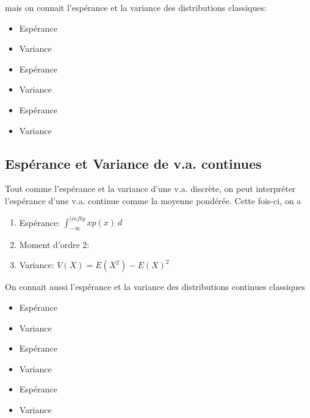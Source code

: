 \documentclass{article}
\begin{document}
mais on connait l'espérance et la variance des distributions classiques:
\begin{enumerate}
	\begin{itemize}[Binomiale]
	    \item Espérance
	    \item Variance
	\end{itemize}
	\begin{itemize}[Poisson]
	    \item Espérance
	    \item Variance
	\end{itemize}
	\begin{itemize}[Géométrique]
	    \item Espérance
	    \item Variance
	\end{itemize}
\end{enumerate}

\subsection{Espérance et Variance de v.a. continues}

Tout comme l'espérance et la variance d'une v.a. discrète, on peut
interpréter l'espérance d'une v.a. continue comme la moyenne pondérée.
Cette fois-ci, on a
\begin{enumerate}
    \item Espérance: $ \int_{{-\infty}}^{{]infty}} {x p(x)} \: d{} {}$
    \item Moment d'ordre 2:
    \item Variance: $V(X) = E(X^2) - E(X)^2 $
\end{enumerate}

On connait aussi l'espérance et la variance des distributions continues
classiques

\begin{enumerate}
	\begin{itemize}[Uniforme]
	    \item Espérance
	    \item Variance
	\end{itemize}
	\begin{itemize}[Exponentielle]
	    \item Espérance
	    \item Variance
	\end{itemize}
	\begin{itemize}[Normale]
	    \item Espérance
	    \item Variance
	\end{itemize}
\end{enumerate}
\end{document}
